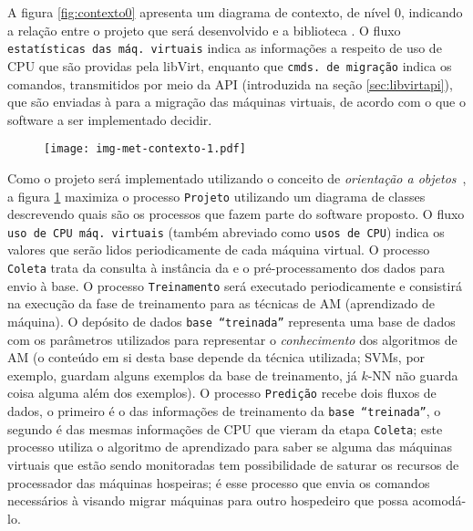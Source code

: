 A figura \ref{fig:contexto0} apresenta um diagrama de contexto, de nível 0,
indicando a relação entre o projeto que será desenvolvido e a biblioteca
\libvirt{}. O fluxo \texttt{estatísticas das máq. virtuais} indica as
informações a respeito de uso de CPU que são providas pela libVirt,
enquanto que \texttt{cmds. de migração} indica os comandos, transmitidos
por meio da API (introduzida na seção \ref{sec:libvirtapi}), que são enviadas
à \libvirt{} para a migração das máquinas virtuais, de acordo com o que o
software a ser implementado decidir.

\begin{figure}[htp]
\centering
\texttt{[image: img-met-contexto-1.pdf]}
\label{fig:contexto1}
\end{figure}

Como o projeto será implementado utilizando o conceito de \emph{orientação a
objetos}~\cite{ricarte2001programacao}, a figura \ref{fig:contexto1} maximiza o
processo \texttt{Projeto} utilizando um diagrama de
classes~\cite{bezerra2002principios} descrevendo quais são os processos que
fazem parte do software proposto. O fluxo \texttt{uso de CPU máq. virtuais}
(também abreviado como \texttt{usos de CPU}) indica os valores que serão lidos
periodicamente de cada máquina virtual.  O processo \texttt{Coleta} trata da
consulta à instância da \libvirt{} e o pré-processamento dos dados para envio à
base. O processo \texttt{Treinamento} será executado periodicamente e
consistirá na execução da fase de treinamento para as técnicas de AM
(aprendizado de máquina). O depósito de dados \texttt{base ``treinada''}
representa uma base de dados com os parâmetros utilizados para representar o
\emph{conhecimento} dos algoritmos de AM (o conteúdo em si desta base depende
da técnica utilizada; SVMs, por exemplo, guardam alguns exemplos da base de
treinamento, já $k$-NN não guarda coisa alguma além dos exemplos). O processo
\texttt{Predição} recebe dois fluxos de dados, o primeiro é o das informações
de treinamento da \texttt{base ``treinada''}, o segundo é das mesmas
informações de CPU que vieram da etapa \texttt{Coleta}; este processo utiliza o
algoritmo de aprendizado para saber se alguma das máquinas virtuais que estão
sendo monitoradas tem possibilidade de saturar os recursos de processador das
máquinas hospeiras; é esse processo que envia os comandos necessários à
\libvirt{} visando migrar máquinas para outro hospedeiro que possa acomodá-lo.

